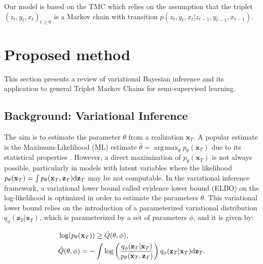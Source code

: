 \documentclass{article}
\DeclareMathOperator*{\argmax}{arg\,max}
\def\x{{\mathbf x}}
\def\z{{\mathbf z}}
\def\y{{\mathbf y}}
\def\yl{{\mathbf y}_{T^{\mathcal{L}}}}
\def\p{p_{\theta}}
\def\q{q_\phi}
\def\Q{\tilde{Q}}
\begin{document}
Our model is based on the TMC \cite{wp-cras-chaines3,pieczynski2005triplet} which
relies on the assumption that the  triplet $(z_t, y_t, x_t)_{t \geq 0}$ 
is a Markov chain with transition $p(z_t, y_t, x_t|z_{t-1},y_{t-1},x_{t-1})$.







\section{Proposed method}
\label{sec:ourmethod}
This section presents a review of variational Bayesian inference and its
application to general Triplet Markov Chains for semi-supervised learning.

\subsection{Background: Variational Inference}
\label{subsec:varinf}
The aim is to estimate the parameter $\theta$ from a realization $\x_T$. 
A popular estimate is the Maximum-Likelihood (ML) estimate 
$\hat{\theta}=\argmax_{\theta} \p(\x_T)$
due to its statistical properties \cite{White-MLE, Douc-ML-MIS}.
However, a direct maximization of $\p(\x_T)$ is not always possible, particularly in
models with latent variables where the likelihood
$\p(\x_T)=\int \p(\x_T,\z_T) {\rm d}\z_T$ may be not computable. 
In the variational inference framework, a variational lower bound called evidence lower bound 
(ELBO) on the log-likelihood  is optimized in order to estimate the parameters $\theta$.
This variational lower bound relies on the introduction of a parameterized 
variational distribution $\q(\z_T|\x_T)$, which is parameterized by a set of parameters $\phi$, 
and it is given by: 

\vspace{-0.2cm}
\begin{align}
&\log(\p(\x_T)) \geq \Q(\theta,\phi) \text{,} \nonumber \\
\label{eq:elbo}
&\Q(\theta,\phi) = - \int \log \left(\frac{\q(\z_T|\x_T)}{\p(\x_T,\z_T)}\right) \q(\z_T|\x_T) {\rm d} \z_T \text{.}
\end{align}
\vspace{-0.3cm}
\end{document}
